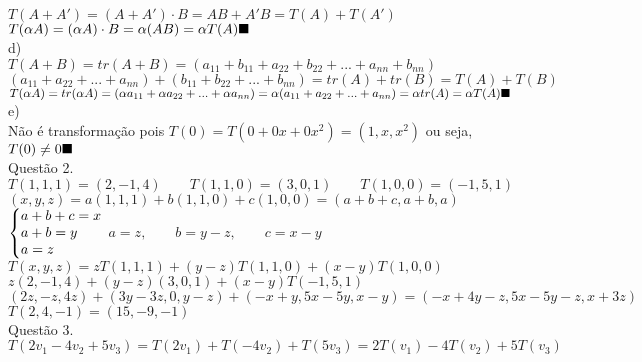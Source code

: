 \documentclass[12pt]{article}
\begin{document}
$T(A+A')=(A+A')\cdot B=AB+A'B=T(A)+T(A')$\\

$T(\alpha A)=(\alpha A)\cdot B=\alpha(AB)=\alpha T(A)\hfill\blacksquare$\\

\noindent d)\\

$T(A+B)=tr(A+B)=(a_{11}+b_{11}+a_{22}+b_{22}+...+a_{nn}+b_{nn})$\\

$(a_{11}+a_{22}+...+a_{nn})+(b_{11}+b_{22}+...+b_{nn})=tr(A)+tr(B)=T(A)+T(B)$\\

$T(\alpha A)=tr(\alpha A)=(\alpha a_{11}+\alpha a_{22}+...+\alpha a_{nn}) = \alpha(a_{11}+a_{22}+...+a_{nn})=\alpha tr(A)=\alpha T(A)\hfill\blacksquare$\\

\noindent e)\\

Não é transformação pois $T(0)=T(0+0x+0x^{2})=(1,x,x^{2})$ ou seja, $T(0)\neq0\hfill\blacksquare$\\

\noindent Questão 2.\\

$T(1,1,1)=(2,-1,4)\qquad T(1,1,0)=(3,0,1)\qquad T(1,0,0)=(-1,5,1)$\\

$(x,y,z)=a(1,1,1)+b(1,1,0)+c(1,0,0)=(a+b+c,a+b,a)$\\

$\left\{\begin{array}{@{}l@{}}
	a+b+c=x\\
	a+b=y\\
	a=z
\end{array}\right.$\qquad\qquad
$a=z,\qquad b=y-z,\qquad c=x-y$\\

$T(x,y,z)=zT(1,1,1)+(y-z)T(1,1,0)+(x-y)T(1,0,0)$\\

$z(2,-1,4)+(y-z)(3,0,1)+(x-y)T(-1,5,1)$\\

$(2z,-z,4z)+(3y-3z,0,y-z)+(-x+y,5x-5y,x-y)=(-x+4y-z,5x-5y-z,x+3z)$\\

$T(2,4,-1)=(15,-9,-1)$\\

\noindent Questão 3.\\

$T(2v_{1}-4v_{2}+5v_{3})=T(2v_{1})+T(-4v_{2})+T(5v_{3})=2T(v_{1})-4T(v_{2})+5T(v_{3})$\\
\end{document}
